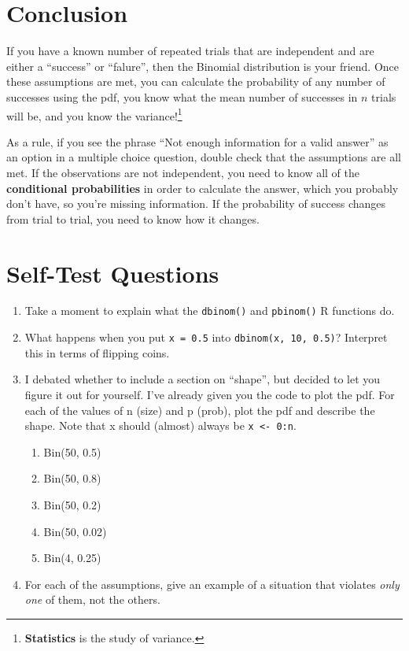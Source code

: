 \documentclass[
  letterpaper,
  DIV=11,
  numbers=noendperiod,
  oneside]{scrreprt}
\providecommand{\tightlist}{%
  \setlength{\itemsep}{0pt}\setlength{\parskip}{0pt}}\usepackage{longtable,booktabs,array}
\begin{document}
\hypertarget{conclusion}{%
\section{Conclusion}\label{conclusion}}

If you have a known number of repeated trials that are independent and
are either a ``success'' or ``falure'', then the Binomial distribution
is your friend. Once these assumptions are met, you can calculate the
probability of any number of successes using the pdf, you know what the
mean number of successes in \(n\) trials will be, and you know the
variance!\footnote{\textbf{Statistics} is the study of variance.}

As a rule, if you see the phrase ``Not enough information for a valid
answer'' as an option in a multiple choice question, double check that
the assumptions are all met. If the observations are not independent,
you need to know all of the \textbf{conditional probabilities} in order
to calculate the answer, which you probably don't have, so you're
missing information. If the probability of success changes from trial to
trial, you need to know how it changes.

\hypertarget{self-test-questions}{%
\section{Self-Test Questions}\label{self-test-questions}}

\begin{enumerate}
\def\labelenumi{\arabic{enumi}.}
\tightlist
\item
  Take a moment to explain what the \texttt{dbinom()} and
  \texttt{pbinom()} R functions do.
\item
  What happens when you put \texttt{x\ =\ 0.5} into
  \texttt{dbinom(x,\ 10,\ 0.5)}? Interpret this in terms of flipping
  coins.
\item
  I debated whether to include a section on ``shape'', but decided to
  let you figure it out for yourself. I've already given you the code to
  plot the pdf. For each of the values of n (size) and p (prob), plot
  the pdf and describe the shape. Note that x should (almost) always be
  \texttt{x\ \textless{}-\ 0:n}.

  \begin{enumerate}
  \def\labelenumii{\alph{enumii})}
  \tightlist
  \item
    Bin(50, 0.5)
  \item
    Bin(50, 0.8)
  \item
    Bin(50, 0.2)
  \item
    Bin(50, 0.02)
  \item
    Bin(4, 0.25)
  \end{enumerate}
\item
  For each of the assumptions, give an example of a situation that
  violates \emph{only one} of them, not the others.
\end{enumerate}
\end{document}
